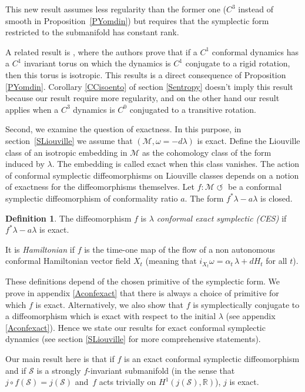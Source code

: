 \documentclass[11pt]{article}
\numberwithin{equation}{section}
\numberwithin{figure}{section}
\numberwithin{table}{section}
\providecommand{\righttoleftarrow}{\mathrel{\circlearrowleft}}
\theoremstyle{definition}
\newtheorem{definition}[theorem]{Definition}
\def\R{\mathbb{R}}
\def\cM{{\mathcal M}}
\def\cS{{\mathcal S}}
\begin{document}
This new result assumes less regularity than the former one ($C^3$ instead of smooth in Proposition~\ref{PYomdin}) but requires that the symplectic form restricted to the submanifold has constant rank.

A related result is \cite[2.2.1]{CaCeLlA2013}, where the authors prove that if a $C^1$ conformal dynamics has a $C^1$ invariant torus on which the dynamics is $C^1$ conjugate to a rigid rotation, then this torus is isotropic. This results is a direct consequence of Proposition \ref{PYomdin}. Corollary \ref{CCisoento} of section \ref{Sentropy} doesn't imply this result because our result require more regularity, and on the other hand our result applies when a $C^3$ dynamics is $C^0$ conjugated to a transitive rotation.

Second, we examine the question of exactness. In this purpose, in section~\ref{SLiouville} we assume that $(\cM, \omega=-d\lambda)$ is exact. Define the Liouville class of an isotropic embedding in $\cM$ as the cohomology class of the form induced by $\lambda$. The embedding is called \hbox{exact} when this class vanishes.
The action of conformal symplectic diffeomorphisms on \hbox{Liouville} classes depends on a notion of exactness for the diffeomorphisms themselves. Let $f: \cM \righttoleftarrow$ be a conformal symplectic diffeomorphism of conformality ratio $a$. The form $f^*\lambda-a\lambda$ is closed.

\begin{definition}
The diffeomorphism $f$ is \emph{$\lambda$ conformal exact symplectic (CES)} if $f^*\lambda-a\lambda$ is exact.

It is \emph{Hamiltonian} if $f$ is the time-one map of the flow of a non autonomous conformal Hamiltonian vector field $X_t$ (meaning that $i_{X_t}\omega = \alpha_t \, \lambda + dH_t$ for all $t$).
\end{definition}

These definitions depend of the chosen primitive of the symplectic form. We prove in appendix \ref{Aconfexact} that there is always a choice of primitive for which $f$ is exact. Alternatively, we also show that $f$ is symplectically conjugate to a diffeomorphism which is exact with respect to the initial $\lambda$ (see appendix \ref{Aconfexact}). Hence we state our results for exact conformal symplectic dynamics (see section \ref{SLiouville} for more comprehensive statements).

Our main result here is that if $f$ is an exact conformal symplectic diffeomorphism and if $\cS$ is a strongly $f$-invariant submanifold (in the sense that $j \circ f (\cS) = j(\cS)$ and~$f$ acts trivially on $H^1(j(\cS),\R)$), $j$ is exact.
\end{document}
